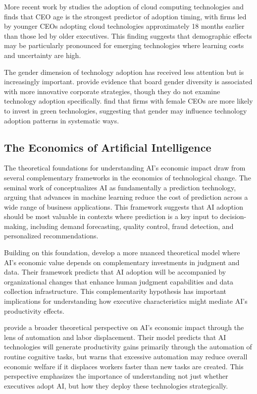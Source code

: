 \documentclass[12pt, a4paper]{article}
\begin{document}
More recent work by \citet{mcfarland2018information} studies the adoption of cloud computing technologies and finds that CEO age is the strongest predictor of adoption timing, with firms led by younger CEOs adopting cloud technologies approximately 18 months earlier than those led by older executives. This finding suggests that demographic effects may be particularly pronounced for emerging technologies where learning costs and uncertainty are high.

The gender dimension of technology adoption has received less attention but is increasingly important. \citet{adams2005board} provide evidence that board gender diversity is associated with more innovative corporate strategies, though they do not examine technology adoption specifically. \citet{chen2019female} find that firms with female CEOs are more likely to invest in green technologies, suggesting that gender may influence technology adoption patterns in systematic ways.

\subsection{The Economics of Artificial Intelligence}

The theoretical foundations for understanding AI's economic impact draw from several complementary frameworks in the economics of technological change. The seminal work of \citet{brynjolfsson2019artificial} conceptualizes AI as fundamentally a prediction technology, arguing that advances in machine learning reduce the cost of prediction across a wide range of business applications. This framework suggests that AI adoption should be most valuable in contexts where prediction is a key input to decision-making, including demand forecasting, quality control, fraud detection, and personalized recommendations.

Building on this foundation, \citet{agrawal2018prediction} develop a more nuanced theoretical model where AI's economic value depends on complementary investments in judgment and data. Their framework predicts that AI adoption will be accompanied by organizational changes that enhance human judgment capabilities and data collection infrastructure. This complementarity hypothesis has important implications for understanding how executive characteristics might mediate AI's productivity effects.

\citet{acemoglu2018race} provide a broader theoretical perspective on AI's economic impact through the lens of automation and labor displacement. Their model predicts that AI technologies will generate productivity gains primarily through the automation of routine cognitive tasks, but warns that excessive automation may reduce overall economic welfare if it displaces workers faster than new tasks are created. This perspective emphasizes the importance of understanding not just whether executives adopt AI, but how they deploy these technologies strategically.
\end{document}
